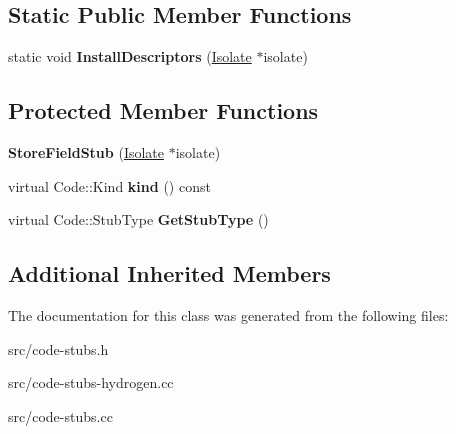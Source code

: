 \subsection*{Static Public Member Functions}
\begin{DoxyCompactItemize}
\item 
\hypertarget{classv8_1_1internal_1_1_store_field_stub_a39d2e94f62d05182b382404ea5140c49}{}static void {\bfseries Install\+Descriptors} (\hyperlink{classv8_1_1internal_1_1_isolate}{Isolate} $\ast$isolate)\label{classv8_1_1internal_1_1_store_field_stub_a39d2e94f62d05182b382404ea5140c49}

\end{DoxyCompactItemize}
\subsection*{Protected Member Functions}
\begin{DoxyCompactItemize}
\item 
\hypertarget{classv8_1_1internal_1_1_store_field_stub_a2847c72315f51cd1ac1ba889186339f5}{}{\bfseries Store\+Field\+Stub} (\hyperlink{classv8_1_1internal_1_1_isolate}{Isolate} $\ast$isolate)\label{classv8_1_1internal_1_1_store_field_stub_a2847c72315f51cd1ac1ba889186339f5}

\item 
\hypertarget{classv8_1_1internal_1_1_store_field_stub_a71fab268454586f5931b03fcbad42f87}{}virtual Code\+::\+Kind {\bfseries kind} () const \label{classv8_1_1internal_1_1_store_field_stub_a71fab268454586f5931b03fcbad42f87}

\item 
\hypertarget{classv8_1_1internal_1_1_store_field_stub_a55180c06c443d5277d5ecc043436c643}{}virtual Code\+::\+Stub\+Type {\bfseries Get\+Stub\+Type} ()\label{classv8_1_1internal_1_1_store_field_stub_a55180c06c443d5277d5ecc043436c643}

\end{DoxyCompactItemize}
\subsection*{Additional Inherited Members}


The documentation for this class was generated from the following files\+:\begin{DoxyCompactItemize}
\item 
src/code-\/stubs.\+h\item 
src/code-\/stubs-\/hydrogen.\+cc\item 
src/code-\/stubs.\+cc\end{DoxyCompactItemize}

